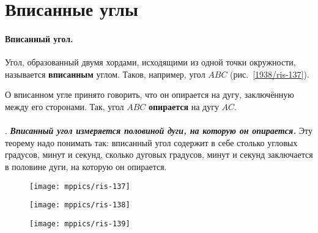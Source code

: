\section{Вписанные углы}

\paragraph{Вписанный угол.}\label{1938/123}
Угол, образованный двумя хордами, исходящими из одной точки окружности, называется \textbf{вписанным} углом.
Таков, например, угол $ABC$ (рис.~\ref{1938/ris-137}).

О вписанном угле принято говорить, что он опирается на дугу, заключённую между его сторонами.
Так, угол $ABC$ \textbf{опирается} на дугу $AC$.

\paragraph{}\label{1938/124} 
.
\textbf{\emph{Вписанный угол измеряется половиной дуги, на которую он опирается.}}
Эту теорему надо понимать так:
вписанный угол содержит в себе столько угловых градусов, минут и секунд, сколько дуговых градусов, минут и секунд заключается в половине дуги, на которую он опирается.

\begin{figure}[h]
\begin{minipage}{.32\textwidth}
\centering
\texttt{[image: mppics/ris-137]}
\end{minipage}
\hfill
\begin{minipage}{.32\textwidth}
\centering
\texttt{[image: mppics/ris-138]}
\end{minipage}
\hfill
\begin{minipage}{.32\textwidth}
\centering
\texttt{[image: mppics/ris-139]}
\end{minipage}

\medskip

\begin{minipage}{.32\textwidth}
\centering
\caption{}\label{1938/ris-137}
\end{minipage}
\hfill
\begin{minipage}{.32\textwidth}
\centering
\caption{}\label{1938/ris-138}
\end{minipage}
\hfill
\begin{minipage}{.32\textwidth}
\centering
\caption{}\label{1938/ris-139}
\end{minipage}
\vskip-4mm
\end{figure}

